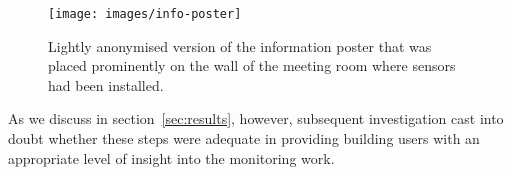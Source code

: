 \begin{figure}
  \centering
  \texttt{[image: images/info-poster]}
  \caption{Lightly anonymised version of the information poster that
    was placed prominently on the wall of the meeting room where
    sensors had been installed.}
  \label{fig:poster}
\end{figure}
As we discuss in section~\ref{sec:results}, however, subsequent investigation
cast into doubt whether these steps were adequate in providing
building users with an appropriate level of insight into the
monitoring work.

